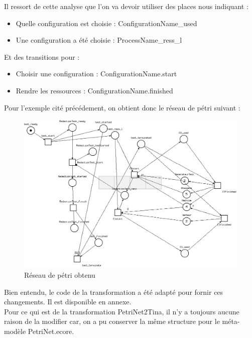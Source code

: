 Il ressort de cette analyse que l'on va devoir utiliser des places nous indiquant :\\

\begin{itemize}
\item Quelle configuration est choisie : ConfigurationName\_used
\item Une configuration a été choisie : ProcessName\_ress\_l\\
\end{itemize}

Et des transitions pour :\\

\begin{itemize}
\item Choisir une configuration : ConfigurationName.start
\item Rendre les ressources : ConfigurationName.finished\\
\end{itemize}

Pour l'exemple cité précédement, on obtient donc le réseau de pétri suivant :\\

\begin{figure}[!h] 
\begin{center}
\includegraphics[width=15cm]{Capture-16.png}
\caption{Réseau de pétri obtenu} 
\label{img1} 
\end{center}
\end{figure}

Bien entendu, le code de la transformation a été adapté pour fornir ces changements. Il est disponible en annexe.\\

Pour ce qui est de la transformation PetriNet2Tina, il n'y a toujours aucune raison de la modifier car, on a pu conserver la même structure pour le méta-modèle PetriNet.ecore.\\







